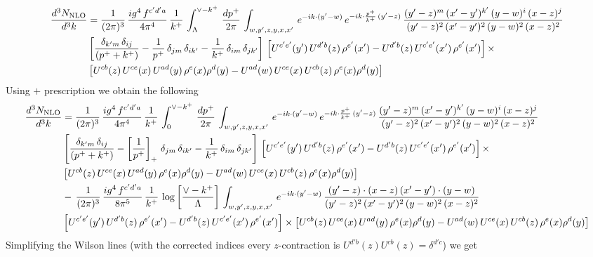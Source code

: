 \documentclass[9pt]{article}
\numberwithin{equation}{section}
\begin{document}
\begin{align}
     \frac{d^{3}N_{\rm NLO}}{d^{3}k} & = \frac{1}{(2\pi)^{3}}\, \frac{ig^{4}\,f^{c'd'a}}{4\pi^{4}}\, \frac{1}{k^{+}}\,\int_{\Lambda}^{\vee-k^{+}}\, \frac{dp^{+}}{2\pi}\, \int_{w,y',z,y,x,x'}\, e^{-ik\cdot (y'-w)}\, e^{-ik\cdot \frac{p^{+}}{k^{+}}\,(y'-z)}\,\frac{(y'-z)^{m}\,(x'-y')^{k'}\,(y-w)^{i}\,(x-z)^{j}}{(y'-z)^{2}\,(x'-y')^{2}\,(y-w)^{2}\,(x-z)^{2}}\notag \\ & \left[\frac{\delta_{k'm}\,\delta_{ij}}{(p^{+}+k^{+})}-\frac{1}{p^{+}}\,\delta_{jm}\,\delta_{ik'}-\frac{1}{k^{+}}\, \delta_{im}\, \delta_{jk'}\right]\, \left[U^{c'e'}(y')\,U^{d'b}(z)\,\rho^{e'}(x')-U^{d'b}(z)\,U^{c'e'}(x')\,\rho^{e'}(x')\right]\times\notag \\ &  \left[U^{cb}(z)\,U^{ce}(x)\,U^{ad}(y)\,\rho^{e}(x)\rho^{d}(y)-U^{ad}(w)\,U^{ce}(x)\,U^{cb}(z)\,\rho^{e}(x)\rho^{d}(y)\right]
\end{align}
Using $+$ prescription we obtain the following
\begin{align}
    \frac{d^{3}N_{\rm NLO}}{d^{3}k} & = \frac{1}{(2\pi)^{3}}\, \frac{ig^{4}\,f^{c'd'a}}{4\pi^{4}}\, \frac{1}{k^{+}}\,\int_{0}^{\vee-k^{+}}\, \frac{dp^{+}}{2\pi}\, \int_{w,y',z,y,x,x'}\, e^{-ik\cdot (y'-w)}\, e^{-ik\cdot \frac{p^{+}}{k^{+}}\,(y'-z)}\,\frac{(y'-z)^{m}\,(x'-y')^{k'}\,(y-w)^{i}\,(x-z)^{j}}{(y'-z)^{2}\,(x'-y')^{2}\,(y-w)^{2}\,(x-z)^{2}}\notag \\ & \left[\frac{\delta_{k'm}\,\delta_{ij}}{(p^{+}+k^{+})}-\left[\frac{1}{p^{+}}\right]_{+}\,\delta_{jm}\,\delta_{ik'}-\frac{1}{k^{+}}\, \delta_{im}\, \delta_{jk'}\right]\, \left[U^{c'e'}(y')\,U^{d'b}(z)\,\rho^{e'}(x')-U^{d'b}(z)\,U^{c'e'}(x')\,\rho^{e'}(x')\right]\times\notag \\ &  \left[U^{cb}(z)\,U^{ce}(x)\,U^{ad}(y)\,\rho^{e}(x)\rho^{d}(y)-U^{ad}(w)\,U^{ce}(x)\,U^{cb}(z)\,\rho^{e}(x)\rho^{d}(y)\right]\notag \\ & -\,\frac{1}{(2\pi)^{3}}\, \frac{ig^{4}\,f^{c'd'a}}{8\pi^{5}}\, \frac{1}{k^{+}}\,\log{\left[\frac{\vee - k^{+}}{\Lambda}\right]}\, \int_{w,y',z,y,x,x'}\, e^{-ik\cdot (y'-w)}\,\frac{(y'-z)\cdot (x-z)\,(x'-y')\cdot (y-w)}{(y'-z)^{2}\,(x'-y')^{2}\,(y-w)^{2}\,(x-z)^{2}}\notag \\ & \left[U^{c'e'}(y')\,U^{d'b}(z)\,\rho^{e'}(x')-U^{d'b}(z)\,U^{c'e'}(x')\,\rho^{e'}(x')\right]\times  \left[U^{cb}(z)\,U^{ce}(x)\,U^{ad}(y)\,\rho^{e}(x)\rho^{d}(y)-U^{ad}(w)\,U^{ce}(x)\,U^{cb}(z)\,\rho^{e}(x)\rho^{d}(y)\right]
\end{align}
Simplifying the Wilson lines (with the corrected indices every $z$-contraction is {\color{red}$U^{d'b}(z)U^{cb}(z)=\delta^{d'c}$}) we get 
\end{document}
